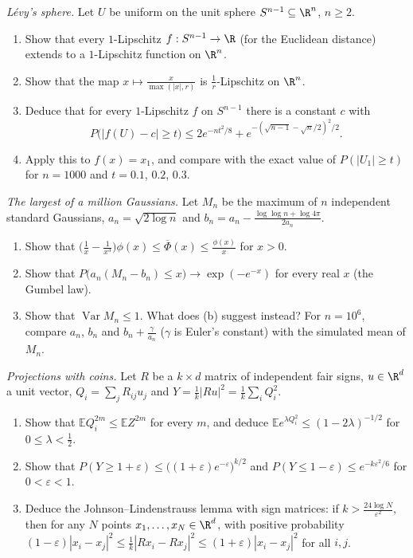 \begin{exercise}[$\star\star$]\label{pb:sphere}
\emph{L\'evy's sphere.} Let $U$ be uniform on the unit sphere $S^{n-1}\subseteq\R^n$, $n\ge2$.
\begin{enumerate}[label=(\alph*)]
\item Show that every $1$-Lipschitz $f:S^{n-1}\to\R$ (for the Euclidean distance) extends to a $1$-Lipschitz function on $\R^n$.
\item Show that the map $x\mapsto\frac x{\max(|x|,r)}$ is $\frac1r$-Lipschitz on $\R^n$.
\item Deduce that for every $1$-Lipschitz $f$ on $S^{n-1}$ there is a constant $c$ with
\[
P\bigl(|f(U)-c|\ge t\bigr)\le2e^{-nt^2/8}+e^{-(\sqrt{n-1}-\sqrt n/2)^2/2}.
\]
\item Apply this to $f(x)=x_1$, and compare with the exact value of $P(|U_1|\ge t)$ for $n=1000$ and $t=0.1$, $0.2$, $0.3$.
\end{enumerate}
\end{exercise}

\begin{exercise}[$\star\star$]\label{pb:gumbelmax}
\emph{The largest of a million Gaussians.} Let $M_n$ be the maximum of $n$ independent standard Gaussians, $a_n=\sqrt{2\log n}$ and
$b_n=a_n-\frac{\log\log n+\log4\pi}{2a_n}$.
\begin{enumerate}[label=(\alph*)]
\item Show that $\bigl(\frac1x-\frac1{x^3}\bigr)\phi(x)\le\overline\Phi(x)\le\frac{\phi(x)}x$ for $x>0$.
\item Show that $P\bigl(a_n(M_n-b_n)\le x\bigr)\to\exp(-e^{-x})$ for every real $x$ (the Gumbel law).
\item Show that $\operatorname{Var}M_n\le1$. What does (b) suggest instead? For $n=10^6$, compare $a_n$, $b_n$ and $b_n+\frac\gamma{a_n}$ ($\gamma$ is Euler's constant) with
the simulated mean of $M_n$.
\end{enumerate}
\end{exercise}

\begin{exercise}[$\star\star$]\label{pb:achlioptas}
\emph{Projections with coins.} Let $R$ be a $k\times d$ matrix of independent fair signs, $u\in\R^d$ a unit vector, $Q_i=\sum_jR_{ij}u_j$ and $Y=\frac1k|Ru|^2=\frac1k\sum_iQ_i^2$.
\begin{enumerate}[label=(\alph*)]
\item Show that $\mathbb EQ_i^{2m}\le\mathbb EZ^{2m}$ for every $m$, and deduce $\mathbb Ee^{\lambda Q_i^2}\le(1-2\lambda)^{-1/2}$ for $0\le\lambda<\frac12$.
\item Show that $P(Y\ge1+\varepsilon)\le\bigl((1+\varepsilon)e^{-\varepsilon}\bigr)^{k/2}$ and $P(Y\le1-\varepsilon)\le e^{-k\varepsilon^2/6}$ for $0<\varepsilon<1$.
\item Deduce the Johnson--Lindenstrauss lemma with sign matrices: if $k>\frac{24\log N}{\varepsilon^2}$, then for any $N$ points $x_1,\dots,x_N\in\R^d$, with positive probability
$(1-\varepsilon)|x_i-x_j|^2\le\frac1k|Rx_i-Rx_j|^2\le(1+\varepsilon)|x_i-x_j|^2$ for all $i,j$.
\end{enumerate}
\end{exercise}

